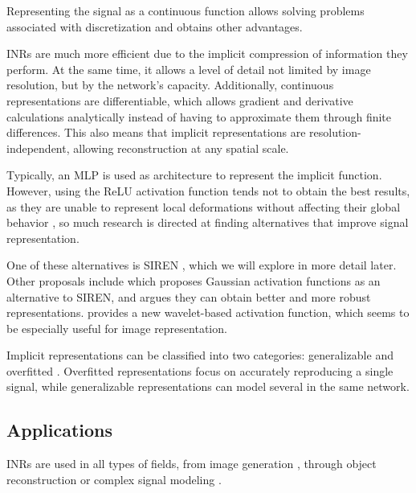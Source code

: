Representing the signal as a continuous function allows solving problems associated with discretization and obtains other advantages.

INRs are much more efficient due to the implicit compression of information they perform. At the same time, it allows a level of detail not limited by image resolution, but by the network's capacity.
Additionally, continuous representations are differentiable, which allows gradient and derivative calculations analytically instead of having to approximate them through finite differences.
This also means that implicit representations are resolution-independent, allowing reconstruction at any spatial scale.

Typically, an MLP is used as architecture to represent the implicit function. However, using the ReLU activation function tends not to obtain the best results, as they are unable to represent local deformations without affecting their global behavior \cite{rahaman2019spectralbiasneuralnetworks},
so much research is directed at finding alternatives that improve signal representation. \cite{essakine2024standimplicitneuralrepresentations}

One of these alternatives is SIREN \cite{sitzmann2020implicitneuralrepresentationsperiodic}, which we will explore in more detail later.
Other proposals include \cite{ramasinghe2022periodicityunifyingframeworkactivations} which proposes Gaussian activation functions as an alternative to SIREN, and argues they can obtain better and more robust representations.
\cite{saragadam2023wirewaveletimplicitneural} provides a new wavelet-based activation function, which seems to be especially useful for image representation.

Implicit representations can be classified into two categories: generalizable and overfitted \cite{yu2024neuraltrajectorymodelimplicit}.
Overfitted representations focus on accurately reproducing a single signal, while generalizable representations can model several in the same network.

\subsection{Applications}
\label{subsec:Aplicacións}

INRs are used in all types of fields, from image generation \cite{reddy2022multiimplicitneuralrepresentationfonts}, through
object reconstruction \cite{mildenhall2020nerfrepresentingscenesneural} \cite{mescheder2019occupancynetworkslearning3d} or complex signal modeling \cite{wu2021iremhighresolutionmagneticresonance}.

